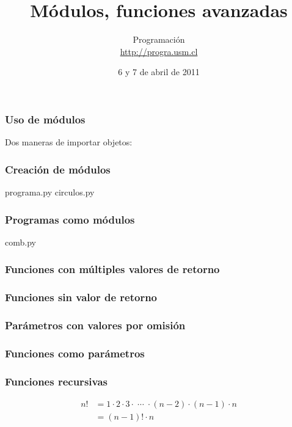 \documentclass[12pt]{beamer}
\title{Módulos, funciones avanzadas}
\author{
  Programación \\ \url{http://progra.usm.cl}
}
\date{6 y 7 de abril de 2011}
\begin{document}
  \begin{frame}
    \maketitle
  \end{frame}

  \begin{frame}
    \frametitle{Uso de módulos}
    \label{uso-modulos}
    Dos maneras de importar objetos:
    \vfill
    \footnotesize
    
    
  \end{frame}

  \begin{frame}
    \frametitle{Creación de módulos}
    \label{creacion-modulos}
    programa.py
    {\footnotesize
    }
    \vfill
    circulos.py
    {\footnotesize
    }
  \end{frame}

  \begin{frame}
    \frametitle{Programas como módulos}
    \label{programa-modulo}
    comb.py
    \footnotesize
    
  \end{frame}

  \begin{frame}
    \frametitle{Funciones con múltiples valores de retorno}
    \label{mult-retornos}
    
    
  \end{frame}

  \begin{frame}
    \frametitle{Funciones sin valor de retorno}
    \label{sin-retorno}
    \footnotesize
    
  \end{frame}

  \begin{frame}
    \frametitle{Parámetros con valores por omisión}
    \label{parametros-por-omision}
    
    
  \end{frame}

  \begin{frame}
    \frametitle{Funciones como parámetros}
    \label{func-parametros}
    \footnotesize
    
  \end{frame}

  \begin{frame}
    \frametitle{Funciones recursivas}
    \label{func-recursivas}
    \begin{align*}
        n! &= 1\cdot 2\cdot 3\cdot\;\cdots\;\cdot (n - 2)\cdot (n - 1)\cdot n \\
           &=  (n - 1)! \cdot n
    \end{align*}
    \vfill
    
  \end{frame}
\end{document}
